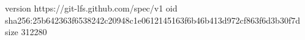 version https://git-lfs.github.com/spec/v1
oid sha256:25b642363f6538242c20948c1e0612145163f6b46b413d972cf863f6d3b30f7d
size 312280

